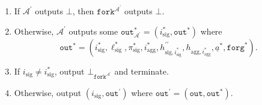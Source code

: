 \documentclass{mrl}
\theoremstyle{definition}
\numberwithin{theorem}{subsection}
\newcommand{\adversary}{\mathcal{A}}
\begin{document}
\begin{description}
\begin{enumerate}
\item If $\adversary^\prime$ outputs $\bot$, then $\texttt{fork}^{\adversary^\prime}$ outputs $\bot$. 

\item  Otherwise, $\adversary^\prime$ outputs some $\texttt{out}_{\adversary^\prime}^* = (i_{\text{sig}}^*, \texttt{out}^*)$ where \[\texttt{out}^* = (i_{\text{sig}}^*, \ell_{\text{sig}}^*, \pi_{\text{sig}}^*, i_{\text{agg}}^*, h_{\text{sig}, i_{\text{sig}}^*}^{\prime \prime}, h_{\text{agg}, i_{\text{agg}}^*}, \underline{a}^*, \texttt{forg}^*).\]


\item If $i_{\text{sig}} \neq i_{\text{sig}}^*$, output $\bot_{\texttt{fork}^{\adversary^\prime}}$ and terminate. 

\item Otherwise, output $(i_{\text{sig}}, \texttt{out}^{\prime})$ where $\texttt{out}^\prime = (\texttt{out}, \texttt{out}^*)$.
\end{enumerate}

\end{description}

\end{document}
